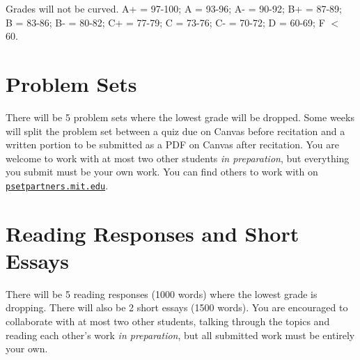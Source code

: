 \documentclass[letterpaper]{infinity_syllabus} %
\begin{document}
\begin{twentyshort}
\end{twentyshort}

Grades will not be curved.
A+ = 97-100; A = 93-96; A- = 90-92; B+ = 87-89;\\ 
B = 83-86; B- = 80-82; C+ = 77-79; C = 73-76; C- = 70-72; D = 60-69; F $<$ 60.


\vspace{0.5cm}
\section{Problem Sets}

There will be 5 problem sets where the lowest grade will be dropped.
Some weeks will split the problem set between a quiz due on Canvas before recitation and a written portion to be submitted as a PDF on Canvas after recitation.
You are welcome to work with at most two other students \textit{in preparation}, but everything you submit must be your own work.
You can find others to work with on \href{psetpartners.mit.edu}{\texttt{psetpartners.mit.edu}}.

\vspace{0.5cm}
\section{Reading Responses and Short Essays}

There will be 5 reading responses (1000 words) where the lowest grade is dropping. 
There will also be 2 short essays (1500 words).
You are encouraged to collaborate with at most two other students, talking through the topics and reading each other's work \textit{in preparation}, but all submitted work must be entirely your own.
\end{document}
